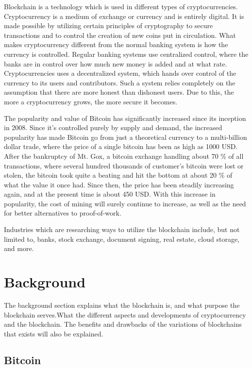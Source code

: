 \documentclass[12pt]{article}
\begin{document}
Blockchain is a technology which is used in different types of cryptocurrencies. Cryptocurrency is a medium of exchange or currency and is entirely digital. It is made possible by utilizing certain principles of cryptography to secure transactions and to control the creation of new coins put in circulation. What makes cryptocurrency different from the normal banking system is how the currency is controlled. Regular banking systems use centralized control, where the banks are in control over how much new money is added and at what rate. Cryptocurrencies uses a decentralized system, which hands over control of the currency to its users and contributors. Such a system relies completely on the assumption that there are more honest than dishonest users. Due to this, the more a cryptocurrency grows, the more secure it becomes. 

The popularity and value of Bitcoin has significantly increased since its inception in 2008. Since it's controlled purely by supply and demand, the increased popularity has made Bitcoin go from just a theoretical currency to a multi-billion dollar trade, where the price of a single bitcoin has been as high as 1000 USD. After the bankruptcy of Mt. Gox, a bitcoin exchange handling about 70 \% of all transactions, where several hundred thousands of customer's bitcoin were lost or stolen, the bitcoin took quite a beating and hit the bottom at about 20 \% of what the value it once had. Since then, the price has been steadily increasing again, and at the present time is about 450 USD. With this increase in popularity, the cost of mining will surely continue to increase, as well as the need for better alternatives to proof-of-work.

Industries which are researching ways to utilize the blockchain include, but not limited to, banks, stock exchange, document signing, real estate, cloud storage, and more. 

\section{Background}
The background section explains what the blockchain is, and what purpose the blockchain serves.What the different aspects and developments of cryptocurrency and the blockchain. The benefits and drawbacks of the variations of blockchains that exists will also be explained. 

\subsection{Bitcoin}
\end{document}
